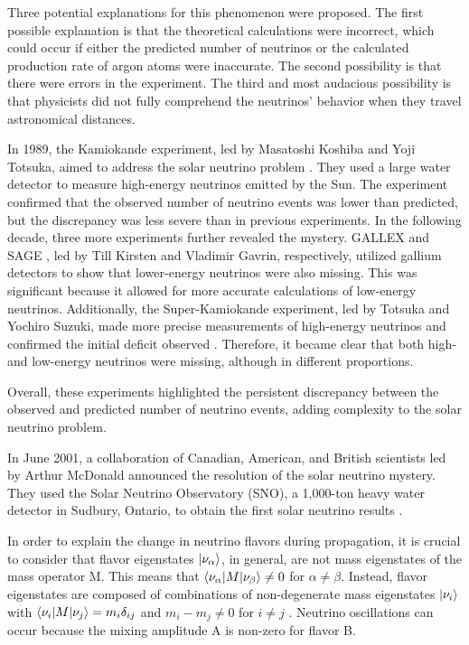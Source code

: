 Three potential explanations for this phenomenon were proposed. The first possible explanation is that the theoretical calculations were incorrect, which could occur if either the predicted number of neutrinos or the calculated production rate of argon atoms were inaccurate. The second possibility is that there were errors in the experiment. The third and most audacious possibility is that physicists did not fully comprehend the neutrinos' behavior when they travel astronomical distances.

In 1989, the Kamiokande experiment, led by Masatoshi Koshiba and Yoji Totsuka, aimed to address the solar neutrino problem \cite{BUGAEV1989391}. They used a large water detector to measure high-energy neutrinos emitted by the Sun. The experiment confirmed that the observed number of neutrino events was lower than predicted, but the discrepancy was less severe than in previous experiments.
In the following decade, three more experiments further revealed the mystery. GALLEX \cite{ANSELMANN1992376} and SAGE \cite{ABDURASHITOV1994234}, led by Till Kirsten and Vladimir Gavrin, respectively, utilized gallium detectors to show that lower-energy neutrinos were also missing. This was significant because it allowed for more accurate calculations of low-energy neutrinos.
Additionally, the Super-Kamiokande experiment, led by Totsuka and Yochiro Suzuki, made more precise measurements of high-energy neutrinos and confirmed the initial deficit observed \cite{Super.81.1158}. Therefore, it became clear that both high- and low-energy neutrinos were missing, although in different proportions.

Overall, these experiments highlighted the persistent discrepancy between the observed and predicted number of neutrino events, adding complexity to the solar neutrino problem.

In June 2001, a collaboration of Canadian, American, and British scientists led by Arthur McDonald announced the resolution of the solar neutrino mystery. They used the Solar Neutrino Observatory (SNO), a 1,000-ton heavy water detector in Sudbury, Ontario, to obtain the first solar neutrino results \cite{SNO}.


In order to explain the change in neutrino flavors during propagation, it is crucial to consider that flavor eigenstates $\ket{\nu_\alpha}$, in general, are not mass eigenstates of the mass operator M. This means that $\braket{\nu_\alpha|M|\nu_\beta}\neq0$ for $\alpha\neq\beta$. Instead, flavor eigenstates are composed of combinations of non-degenerate mass eigenstates $\ket{\nu_i}$ with $\braket{\nu_i|M|\nu_j}=m_i\delta_{ij}$  and $m_i-m_j\neq 0$ for $i\neq j$ . Neutrino oscillations can occur because the mixing amplitude A is non-zero for flavor B.

